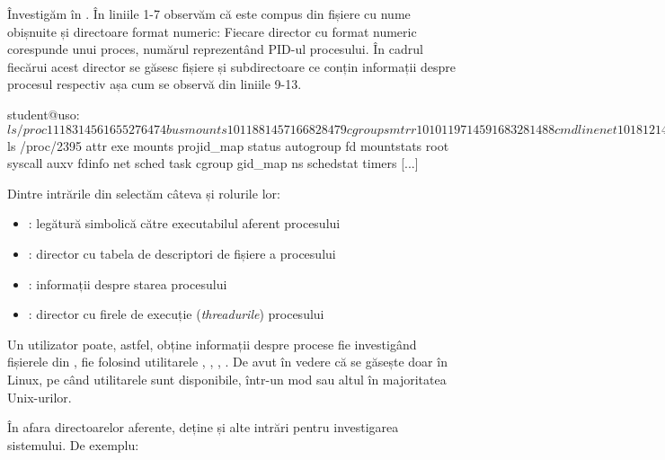 Învestigăm  în . În liniile 1-7
observăm că  este compus din fișiere cu nume obișnuite și directoare format numeric:
Fiecare director cu format numeric corespunde unui proces, numărul reprezentând
PID-ul procesului. În cadrul fiecărui acest director se găsesc fișiere și
subdirectoare ce conțin informații despre procesul respectiv așa cum se observă din liniile 9-13.

\begin{screen}[caption={Informații din /proc},label={lst:process:proc}]
student@uso:~$ ls /proc
1      1183   1456   1655  276   474        bus          mounts
10     1188   1457   1668  28    479        cgroups      mtrr
1010   1197   1459   1683  281   488        cmdline      net
1018   12     14636  17    284   493        consoles     pagetypeinfo
1019   1202   1464   1742  287   496        cpuinfo      partitions
1032   1205   1467   176   288   498        crypto       sched_debug
[...]
student@uso:~$ ls /proc/2395
attr             exe        mounts         projid_map    status
autogroup        fd         mountstats     root          syscall
auxv             fdinfo     net            sched         task
cgroup           gid_map    ns             schedstat     timers
[...]
\end{screen}

Dintre intrările din  selectăm câteva și rolurile lor:

\begin{itemize}
  \item {}: legătură simbolică către executabilul aferent procesului
  \item {}: director cu tabela de descriptori de fișiere a procesului
  \item {}: informații despre starea procesului
  \item {}: director cu firele de execuție (\textit{threadurile}) procesului
\end{itemize}

Un utilizator poate, astfel, obține informații despre procese fie investigând
fișierele din , fie folosind utilitarele , , , . De avut în
vedere că  se găsește doar în Linux, pe când utilitarele sunt disponibile,
într-un mod sau altul în majoritatea Unix-urilor.

În afara directoarelor aferente,  deține și alte intrări pentru investigarea sistemului. De exemplu:


